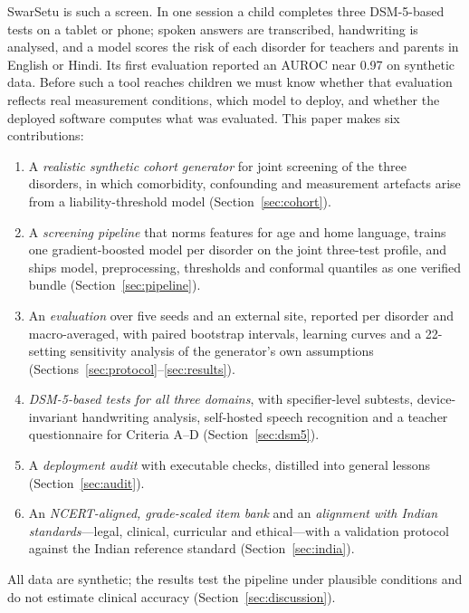 \documentclass[conference]{IEEEtran}
\begin{document}
SwarSetu is such a screen. In one session a child completes three DSM-5-based tests on a tablet or phone; spoken answers are transcribed, handwriting is analysed, and a model scores the risk of each disorder for teachers and parents in English or Hindi. Its first evaluation reported an AUROC near 0.97 on synthetic data. Before such a tool reaches children we must know whether that evaluation reflects real measurement conditions, which model to deploy, and whether the deployed software computes what was evaluated. This paper makes six contributions:
\begin{enumerate}
\item A \emph{realistic synthetic cohort generator} for joint screening of the three disorders, in which comorbidity, confounding and measurement artefacts arise from a liability-threshold model (Section~\ref{sec:cohort}).
\item A \emph{screening pipeline} that norms features for age and home language, trains one gradient-boosted model per disorder on the joint three-test profile, and ships model, preprocessing, thresholds and conformal quantiles as one verified bundle (Section~\ref{sec:pipeline}).
\item An \emph{evaluation} over five seeds and an external site, reported per disorder and macro-averaged, with paired bootstrap intervals, learning curves and a 22-setting sensitivity analysis of the generator's own assumptions (Sections~\ref{sec:protocol}--\ref{sec:results}).
\item \emph{DSM-5-based tests for all three domains}, with specifier-level subtests, device-invariant handwriting analysis, self-hosted speech recognition and a teacher questionnaire for Criteria A--D (Section~\ref{sec:dsm5}).
\item A \emph{deployment audit} with executable checks, distilled into general lessons (Section~\ref{sec:audit}).
\item An \emph{NCERT-aligned, grade-scaled item bank} and an \emph{alignment with Indian standards}---legal, clinical, curricular and ethical---with a validation protocol against the Indian reference standard (Section~\ref{sec:india}).
\end{enumerate}
All data are synthetic; the results test the pipeline under plausible conditions and do not estimate clinical accuracy (Section~\ref{sec:discussion}).

\end{document}
